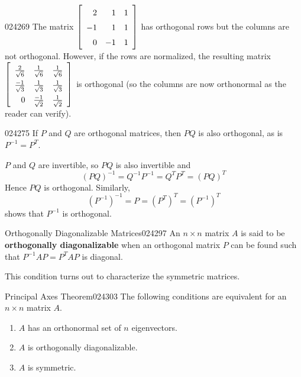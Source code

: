 \begin{example}{}{024269}
The matrix $\leftB \begin{array}{rrr}
2 & 1 & 1 \\
-1 & 1 & 1 \\
0 & -1 & 1 
\end{array}\rightB$
 has orthogonal rows but the columns are not orthogonal.
However, if the rows are normalized, the resulting matrix $\def\arraystretch{1.5}\leftB \begin{array}{rrr}
\frac{2}{\sqrt{6}} & \frac{1}{\sqrt{6}} & \frac{1}{\sqrt{6}} \\
\frac{-1}{\sqrt{3}} & \frac{1}{\sqrt{3}} & \frac{1}{\sqrt{3}} \\
0 & \frac{-1}{\sqrt{2}} & \frac{1}{\sqrt{2}} 
\end{array}\rightB$
 is orthogonal (so the columns are now orthonormal as the reader can verify).
\end{example}

\begin{example}{}{024275}
If $P$ and $Q$ are orthogonal matrices, then $PQ$ is also orthogonal, as is $P^{-1} = P^{T}$.


\begin{solution}
$P$ and $Q$ are invertible, so $PQ$ is also invertible and 
\begin{equation*}
(PQ)^{-1} = Q^{-1}P^{-1} = Q^{T}P^{T} = (PQ)^{T}
\end{equation*}
Hence $PQ$ is orthogonal. Similarly, 
\begin{equation*}
(P^{-1})^{-1} = P = (P^{T})^{T} = (P^{-1})^{T}
\end{equation*}
shows that $P^{-1}$ is orthogonal.
\end{solution}
\end{example}

\begin{definition}{Orthogonally Diagonalizable Matrices}{024297}
An $n \times n$ matrix $A$ is said to be \textbf{orthogonally diagonalizable} when an orthogonal matrix $P$ can be found such that  $P^{-1}AP = P^{T}AP$ is diagonal.
\end{definition}

This condition turns out to characterize the symmetric matrices.

\begin{theorem}{Principal Axes Theorem}{024303}
The following conditions are equivalent for an $n \times n$ matrix $A$.

\begin{enumerate}
\item $A$ has an orthonormal set of $n$ eigenvectors.

\item $A$ is orthogonally diagonalizable.

\item $A$ is symmetric.

\end{enumerate}
\end{theorem}

